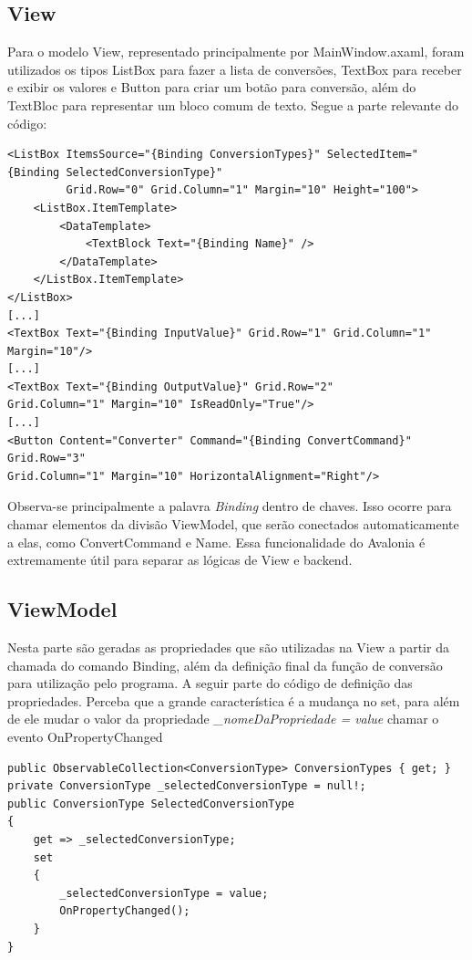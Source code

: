 \documentclass[
	12pt,				%
	oneside,			%
	a4paper,			%
	english,			%
	brazil,				%
	]{abntex2}
\begin{document}
{\subsection{View}
 
Para o modelo View, representado principalmente por MainWindow.axaml, foram utilizados os tipos ListBox para fazer a lista de conversões, TextBox para receber e exibir os valores e Button para criar um botão para conversão, além do TextBloc para representar um bloco comum de texto. Segue a parte relevante do código:

\begin{verbatim}
<ListBox ItemsSource="{Binding ConversionTypes}" SelectedItem="{Binding SelectedConversionType}" 
         Grid.Row="0" Grid.Column="1" Margin="10" Height="100">
    <ListBox.ItemTemplate>
        <DataTemplate>
            <TextBlock Text="{Binding Name}" />
        </DataTemplate>
    </ListBox.ItemTemplate>
</ListBox>
[...]
<TextBox Text="{Binding InputValue}" Grid.Row="1" Grid.Column="1" Margin="10"/>
[...]
<TextBox Text="{Binding OutputValue}" Grid.Row="2"
Grid.Column="1" Margin="10" IsReadOnly="True"/>
[...]
<Button Content="Converter" Command="{Binding ConvertCommand}" Grid.Row="3"
Grid.Column="1" Margin="10" HorizontalAlignment="Right"/>
\end{verbatim}
Observa-se principalmente a palavra \textit{Binding} dentro de chaves. Isso ocorre para chamar elementos da divisão ViewModel, que serão conectados automaticamente a elas, como ConvertCommand e Name. Essa funcionalidade do Avalonia é extremamente útil para separar as lógicas de View e backend.

\subsection{ViewModel}

Nesta parte são geradas as propriedades que são utilizadas na View a partir da chamada do comando Binding, além da definição final da função de conversão para utilização pelo programa. A seguir parte do código de definição das propriedades. Perceba que a grande característica é a mudança no set, para além de ele mudar o valor da propriedade \textit{\_nomeDaPropriedade = value} chamar o evento OnPropertyChanged

\begin{verbatim}
public ObservableCollection<ConversionType> ConversionTypes { get; }
private ConversionType _selectedConversionType = null!;
public ConversionType SelectedConversionType
{
    get => _selectedConversionType;
    set
    {
        _selectedConversionType = value;
        OnPropertyChanged();
    }
}


\end{verbatim}}
\end{document}
